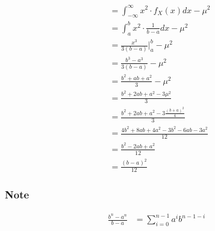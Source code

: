\documentclass[12pt]{article}
\begin{document}
\begin{itemize}
\begin{align*}
                    &= \int_{-\infty}^{\infty} x^2 \cdot f_X(x) dx - \mu^2 \\
                    &= \int_{a}^{b} x^2 \cdot \frac{1}{b-a} dx - \mu^2 \\
                    &= \frac{x^3}{3(b-a)} \Big|_{a}^{b} - \mu^2 \\
                    &= \frac{b^3 - a^3}{3(b-a)} - \mu^2 \\
                    &= \frac{b^2 + ab + a^2}{3} - \mu^2 \\
                    &= \frac{b^2 + 2ab + a^2 - 3\mu^2}{3} \\
                    &= \frac{b^2 + 2ab + a^2 - 3\frac{{(b+a)}^2}{4}}{3} \\
                    &= \frac{4b^2 + 8ab + 4a^2 - 3b^2 - 6ab - 3a^2}{12} \\
                    &= \frac{b^2 - 2ab + a^2}{12} \\
                    &= \frac{{(b-a)}^2}{12} 
                \end{align*}
                \subsubsection{Note}
                    \begin{align*}
                        \frac{b^n-a^n}{b-a} &= \sum_{i=0}^{n-1} a^i b^{n-1-i}
                    \end{align*}
            \end{itemize}
\end{document}
